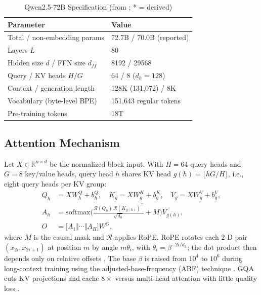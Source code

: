 \documentclass[conference]{IEEEtran}
\newcommand{\softmax}{\mathrm{softmax}}
\begin{document}
\begin{table}[!tb]
\caption{Qwen2.5-72B Specification (from \cite{qwen25,qwen25blog}; * = derived)}
\label{tab:spec}
\centering\footnotesize
\begin{tabular}{@{}ll@{}}
\toprule
Parameter & Value \\
\midrule
Total / non-embedding params & 72.7B / 70.0B (reported) \\
Layers $L$ & 80 \\
Hidden size $d$ / FFN size $d_{ff}$ & 8192 / 29568 \\
Query / KV heads $H/G$ & 64 / 8 ($d_h{=}128$) \\
Context / generation length & 128K (131{,}072) / 8K \\
Vocabulary (byte-level BPE) & 151{,}643 regular tokens \\
Pre-training tokens & 18T \\
\bottomrule
\end{tabular}
\end{table}

\subsection{Attention Mechanism}
Let $X\in\mathbb{R}^{n\times d}$ be the normalized block input. With $H{=}64$ query heads and $G{=}8$ key/value heads, query head $h$ shares KV head $g(h)=\lfloor hG/H\rfloor$, i.e., eight query heads per KV group:
\begin{align}
Q_h &= XW^Q_h + b^Q_h,\quad K_g = XW^K_g + b^K_g,\quad V_g = XW^V_g + b^V_g,\\
A_h &= \softmax\!\Big(\tfrac{\mathcal{R}(Q_h)\,\mathcal{R}(K_{g(h)})^{\top}}{\sqrt{d_h}} + M\Big)V_{g(h)},\\
O &= \big[A_1\Vert\cdots\Vert A_H\big]W^O,
\end{align}
where $M$ is the causal mask and $\mathcal{R}$ applies RoPE. RoPE rotates each 2-D pair $(x_{2i},x_{2i+1})$ at position $m$ by angle $m\theta_i$, with $\theta_i=\beta^{-2i/d_h}$; the dot product then depends only on relative offsets \cite{rope}. The base $\beta$ is raised from $10^4$ to $10^6$ during long-context training using the adjusted-base-frequency (ABF) technique \cite{abf,qwen25}. GQA cuts KV projections and cache $8\times$ versus multi-head attention with little quality loss \cite{gqa}.
\end{document}
